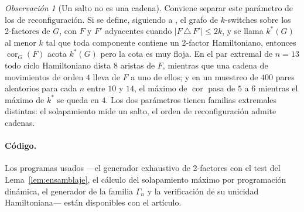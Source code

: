 \documentclass[11pt,a4paper]{article}
\theoremstyle{definition}
\theoremstyle{remark}
\newtheorem{observacion}[teorema]{Observación}
\newcommand{\cor}{\operatorname{cor}}
\begin{document}
\begin{observacion}[Un salto no es una cadena]\label{obs:separacion}
Conviene separar este parámetro de los de reconfiguración. Si se define, siguiendo a \cite{kps}, el grafo de $k$-switches sobre los 2-factores de $G$, con $F$ y $F'$ adyacentes cuando $|F\,\triangle\,F'|\le2k$, y se llama $k^*(G)$ al menor $k$ tal que toda componente contiene un 2-factor Hamiltoniano, entonces $\cor_G(F)$ acota $k^*(G)$ pero la cota es muy floja. En el par extremal de $n=13$ todo ciclo Hamiltoniano dista $8$ aristas de $F$, mientras que una cadena de movimientos de orden $4$ lleva de $F$ a uno de ellos; y en un muestreo de $400$ pares aleatorios para cada $n$ entre $10$ y $14$, el máximo de $\cor$ pasa de $5$ a $6$ mientras el máximo de $k^*$ se queda en $4$. Los dos parámetros tienen familias extremales distintas: el solapamiento mide un salto, el orden de reconfiguración admite cadenas.
\end{observacion}

\paragraph{Código.} Los programas usados —el generador exhaustivo de 2-factores con el test del Lema~\ref{lem:ensamblaje}, el cálculo del solapamiento máximo por programación dinámica, el generador de la familia $\Gamma_n$ y la verificación de su unicidad Hamiltoniana— están disponibles con el artículo.
\end{document}
